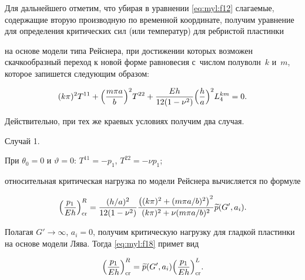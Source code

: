 Для дальнейшего отметим, что убирая в уравнении \eqref{eq:myl:f12} слагаемые, содержащие вторую производную по временной координате, получим уравнение для определения критических сил (или температур) для ребристой пластинки 

на основе модели типа Рейснера, при достижении которых возможен скачкообразный переход к новой форме равновесия с~числом полуволн~$k$ и~$m$, которое запишется следующим образом:

\begin{equation}\label{eq:myl:f17}

(k\pi)^2T^{11}+\Bigl(\frac{m\pi a}{b}\Bigr)^2T^{22}+\frac{E h}{12(1-\nu^2)}

\Bigl(\frac{h}{a}\Bigr)^2L_4^{km}=0.

\end{equation}

Действительно, при тех же краевых условиях получим два случая.



\smallskip



{\small \sc Случай 1.}

При $\theta_0=0$ и $\vartheta=0$: $T^{11}=-p_1$, $T^{22}=-\nu p_1$; 

относительная критическая нагрузка по модели Рейснера вычисляется по формуле

\begin{equation}\label{eq:myl:f18}

\Bigl(\frac{p_1}{E h}\Bigr)_{\text{cr}}^R=

\frac{({h}/{a})^2}{12(1-\nu^2)}

\frac{\bigl((k\pi)^2+({m\pi a}/{b})^2\bigr)^2}{(k\pi)^2+\nu ({m\pi a}/{b})^2} \widetilde{p}(G',a_i).

\end{equation}

Полагая $G'\rightarrow\infty$, $a_i=0$, получим критическую нагрузку для гладкой пластинки на основе модели Лява. Тогда \eqref{eq:myl:f18} примет вид

\begin{equation}\label{eq:myl:f19}

\Bigl(\frac{p_1}{E h}\Bigr)_{\text{cr}}^R=\widetilde{p}(G',a_i)\Bigl(\frac{p_1}{E h}\Bigr)_{\text{cr}}^L.

\end{equation}



\smallskip



